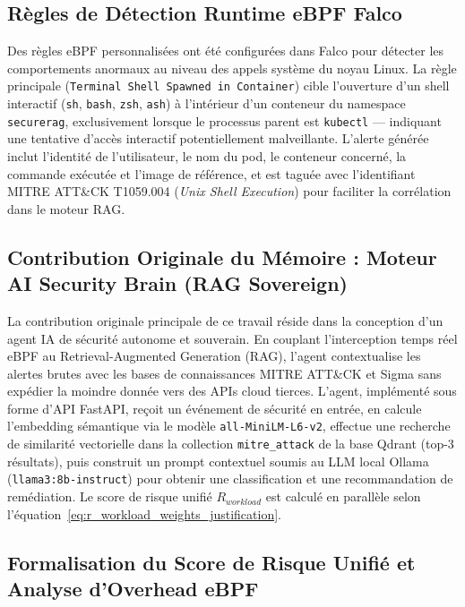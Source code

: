 \subsection{Règles de Détection Runtime eBPF Falco}

Des règles eBPF personnalisées ont été configurées dans Falco pour détecter les comportements anormaux au niveau des appels système du noyau Linux. La règle principale (\texttt{Terminal Shell Spawned in Container}) cible l'ouverture d'un shell interactif (\texttt{sh}, \texttt{bash}, \texttt{zsh}, \texttt{ash}) à l'intérieur d'un conteneur du namespace \texttt{securerag}, exclusivement lorsque le processus parent est \texttt{kubectl} — indiquant une tentative d'accès interactif potentiellement malveillante. L'alerte générée inclut l'identité de l'utilisateur, le nom du pod, le conteneur concerné, la commande exécutée et l'image de référence, et est taguée avec l'identifiant MITRE ATT\&CK T1059.004 (\textit{Unix Shell Execution}) pour faciliter la corrélation dans le moteur RAG.

\subsection{Contribution Originale du Mémoire : Moteur AI Security Brain (RAG Sovereign)}

La contribution originale principale de ce travail réside dans la conception d'un agent IA de sécurité autonome et souverain. En couplant l'interception temps réel eBPF au Retrieval-Augmented Generation (RAG), l'agent contextualise les alertes brutes avec les bases de connaissances MITRE ATT\&CK et Sigma sans expédier la moindre donnée vers des APIs cloud tierces. L'agent, implémenté sous forme d'API FastAPI, reçoit un événement de sécurité en entrée, en calcule l'embedding sémantique via le modèle \texttt{all-MiniLM-L6-v2}, effectue une recherche de similarité vectorielle dans la collection \texttt{mitre\_attack} de la base Qdrant (top-3 résultats), puis construit un prompt contextuel soumis au LLM local Ollama (\texttt{llama3:8b-instruct}) pour obtenir une classification et une recommandation de remédiation. Le score de risque unifié $R_{workload}$ est calculé en parallèle selon l'équation~\ref{eq:r_workload_weights_justification}.

\subsection{Formalisation du Score de Risque Unifié et Analyse d'Overhead eBPF}

